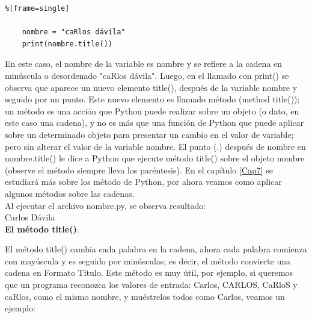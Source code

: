 \hspace{-2.15cm}{\ttfamily \scriptsize nombre.py}  \vspace{-0.55cm}
\begin{lstlisting}%[frame=single]
	
	nombre = "caRlos dávila"
	print(nombre.title())	
\end{lstlisting}
En este caso, el nombre de la variable es {\ttfamily  nombre}  y  se refiere a la cadena en minúscula o desordenado 
"{}caRlos dávila".   Luego, en el llamado con {\ttfamily   print()}  se observa  que  aparece  un nuevo elemento {\ttfamily title()}, después de la variable {\ttfamily  nombre} y seguido por un punto. Este nuevo elemento  es llamado método (method title()); un método es una acción que Python puede realizar sobre un objeto (o dato, en este caso una cadena), y no es más que  una función de Python que puede aplicar sobre un determinado objeto para presentar  un cambio en el valor de variable;  pero sin alterar el valor de la variable {\ttfamily nombre}.  El punto (.) después de  {\ttfamily nombre} en  {\ttfamily nombre.title()} le dice a Python que ejecute método  {\ttfamily title()} sobre  el objeto  {\ttfamily nombre} (observe el método  siempre lleva los paréntesis). En el capítulo \ref{Cap7} se estudiará más sobre los método de Python, por ahora veamos como aplicar algunos métodos sobre las cadenas.\\


Al ejecutar el archivo  {\ttfamily nombre.py},   se observa resultado:\\

{\ttfamily\scriptsize\scriptsize {\color{blue}   
		\hspace{-0.65cm}Carlos Dávila}} \\

{\bf El método {\ttfamily title()}}: 	

El método {\ttfamily title()} cambia cada palabra en la cadena, ahora cada palabra comienza con mayúscula y es seguido por minúsculas; es decir, el método convierte una cadena en Formato Título. Este método es muy  útil,  por ejemplo, si queremos que un programa reconozca los valores de entrada: Carlos, CARLOS, CaRloS y caRlos, como el mismo nombre, y muéstrelos todos como Carlos, veamos un ejemplo:


